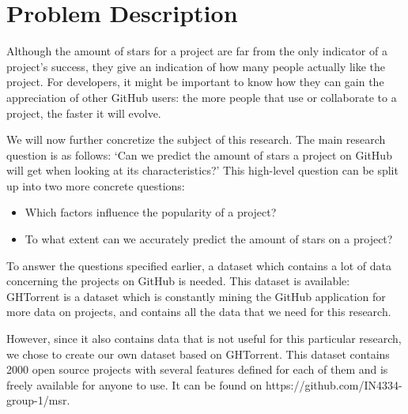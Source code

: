\section{Problem Description}
    Although the amount of stars for a project are far from the only indicator of a project's success, they give an indication of how many people actually like the project.
    For developers, it might be important to know how they can gain the appreciation of other GitHub users: the more people that use or collaborate to a project, the faster it will evolve.

    We will now further concretize the subject of this research. 
    The main research question is as follows: `Can we predict the amount of stars a project on GitHub will get when looking at its characteristics?'
    This high-level question can be split up into two more concrete questions:
    \begin{itemize}
        \item Which factors influence the popularity of a project?
        \item To what extent can we accurately predict the amount of stars on a project?
    \end{itemize}
    
    
    To answer the questions specified earlier, a dataset which contains a lot of data concerning the projects on GitHub is needed. 
    This dataset is available: GHTorrent \cite{gousios-2013} is a dataset which is constantly mining the GitHub application for more data on projects, and contains all the data that we need for this research.


    However, since it also contains data that is not useful for this particular research, we chose to create our own dataset based on GHTorrent.
    This dataset contains 2000 open source projects with several features defined for each of them and is freely available for anyone to use.
    It can  be found on https://github.com/IN4334-group-1/msr.



